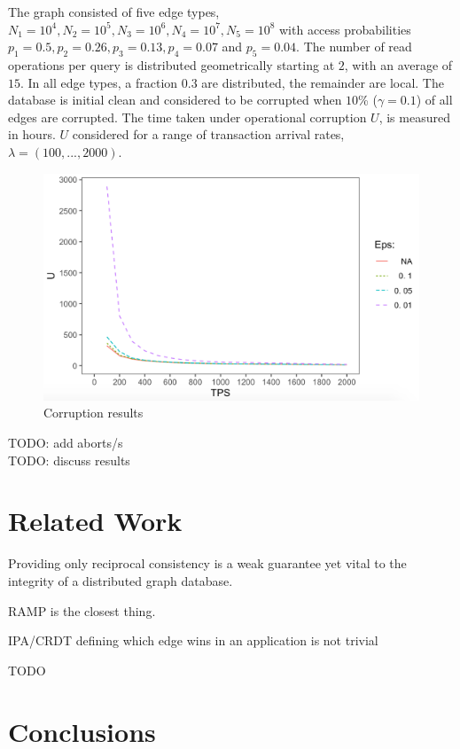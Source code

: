 \documentclass[sigplan,10pt]{acmart}
\begin{document}
The graph consisted of five edge types, $N_1=10^4, N_2=10^5, N_3=10^6, N_4=10^7, N_5=10^8$ with access probabilities $p_1 =0.5, p_2 =0.26, p_3=0.13, p_4=0.07$ and $p_5 =0.04$. The number of read operations per query is distributed geometrically starting at $2$, with an average of $15$. In all edge types, a fraction $0.3$ are distributed, the remainder are local. The database is initial clean and considered to be corrupted when $10$\% ($\gamma = 0.1$) of all edges are corrupted. The time taken under operational corruption $U$, is measured in hours. $U$ considered for a range of transaction arrival rates, $\lambda = (100, ..., 2000)$.

\begin{figure}[h]
  \centering
  \includegraphics[width=\linewidth]{./images/results}
  \caption{Corruption results}
  \label{results}
\end{figure}

TODO: add aborts/s \\
TODO: discuss results

\section{Related Work}

Providing only reciprocal consistency is a weak guarantee yet vital to the integrity of a distributed graph database.

RAMP is the closest thing.

IPA/CRDT defining which edge wins in an application is not trivial

TODO

\section{Conclusions}
\end{document}
